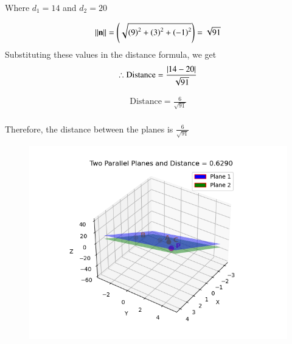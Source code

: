 \documentclass[journal,12pt,onecolumn]{IEEEtran}
\begin{document}
Where $d_1 = 14$ and $d_2 = 20$

\begin{align}
{\left\lVert\mathbf{n}\right\rVert} = \left(\sqrt{\left(9\right)^2 + \left(3\right)^2 + \left(-1\right)^2}\right) = \sqrt{91}
\end{align}
Substituting these values in the distance formula, we get
\begin{align}
\therefore \text{Distance} = \frac{\left\vert14-20\right\vert}{\sqrt{91}}
\end{align}

\begin{align}
\text{Distance} = \frac{6}{\sqrt{91}}
\end{align}
\\
Therefore, the distance between the planes is $\frac{6}{\sqrt{91}}$
\begin{figure}[h!]
    \centering
    \includegraphics[height=0.5\textheight, keepaspectratio]{figs/fig.png}
    \label{figure_1}
\end{figure}
\end{document}
